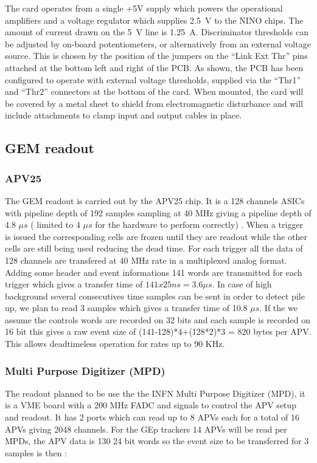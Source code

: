 \documentclass{article}
\begin{document}
The card operates from a single +5V supply which powers the operational
amplifiers and a voltage regulator which supplies 2.5~V to the NINO
chips. The amount of current drawn on the 5~V line is 1.25~A. Discriminator
thresholds can be adjusted by on-board potentiometers, or alternatively
from an external voltage source. This is chosen by the position of
the jumpers on the ``Link Ext Thr'' pins attached at the bottom
left and right of the PCB. As shown, the PCB has been configured to
operate with external voltage thresholds, supplied via the ``Thr1''
and ``Thr2'' connectors at the bottom of the card. When mounted,
the card will be covered by a metal sheet to shield from electromagnetic
disturbance and will include attachments to clamp input and output
cables in place.

\subsection{GEM readout}
\subsubsection{APV25}
The GEM readout is carried out by the APV25 chip. It is a 128 channels ASICs with pipeline depth of 192 samples sampling at 40 MHz giving a pipeline depth of 4.8 $\mu s$ ( limited to 4 $\mu s$ for the hardware to perform correctly) . When a trigger is issued the corresponding cells are frozen until they are readout while the other cells are still being used reducing the dead time.
For each trigger all the data of 128 channels are transfered at 40 MHz rate in a multiplexed analog format. Adding some header and event informations 141 words are transmitted for each trigger which gives a transfer time of $141x25 ns = 3.6 \mu s $. In case of high background several consecutives time samples can be sent in order to detect pile up, we plan to read 3 samples which gives a transfer time of 10.8 $\mu s$. If the we assume the controls words are recorded on 32 bits and each sample is recorded on 16 bit this gives a raw event size of (141-128)*4+(128*2)*3 = 820 bytes per APV. This allows deadtimeless operation for rates up to 90 KHz.

\subsubsection {Multi Purpose Digitizer (MPD)}
 The readout planned to be use the the INFN Multi Purpose Digitizer (MPD), it is a VME board with a 200 MHz FADC and signals to control the APV setup and readout. It has 2 ports which can read up to 8 APVs each for a total of 16 APVs giving 2048 channels. 
For the GEp trackers 14 APVs will be read per MPDs, the APV data is 130 24 bit words so the event size to be transferred for 3 samples is then :
\end{document}
